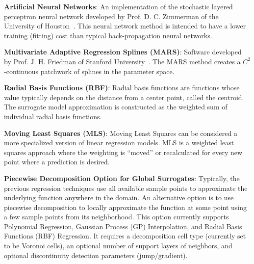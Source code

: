\textbf{Artificial Neural Networks}: An implementation of the
stochastic layered perceptron neural network developed by Prof. D. C.
Zimmerman of the University of Houston~\cite{Zim96}. This neural network
method is intended to have a lower training (fitting) cost than
typical back-propagation neural networks.

\textbf{Multivariate Adaptive Regression Splines (MARS)}: Software
developed by Prof. J. H. Friedman of Stanford University~\cite{Fri91}.
The MARS method creates a $C^2$-continuous patchwork of splines in the
parameter space.

\textbf{Radial Basis Functions (RBF)}:  Radial basis functions are 
functions whose value typically depends on the distance from a center point, 
called the centroid.  The surrogate model approximation is constructed
as the weighted sum of individual radial basis functions. 

\textbf{Moving Least Squares (MLS)}: Moving Least Squares can be 
considered a more specialized version of linear regression models.
MLS is a weighted least squares approach where the weighting is 
``moved'' or recalculated for every new point where 
a prediction is desired.~\cite{Nea04} 

\textbf{Piecewise Decomposition Option for Global Surrogates}: Typically, the previous regression techniques use all available sample points to approximate the underlying function anywhere in the domain. An alternative option is to use piecewise decomposition to locally approximate the function at some point using a few sample points from its neighborhood. This option currently supports Polynomial Regression, Gaussian Process (GP) Interpolation, and Radial Basis Functions (RBF) Regression. It requires a decomposition cell type (currently set to be Voronoi cells), an optional number of support layers of neighbors, and optional discontinuity detection parameters (jump/gradient).   


